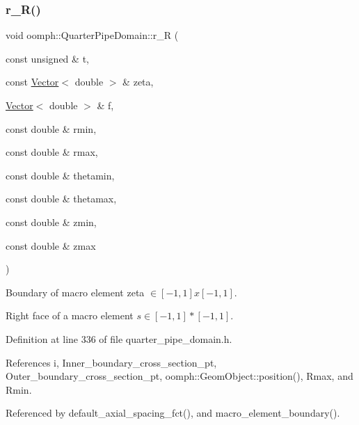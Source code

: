 \subsubsection{\texorpdfstring{r\+\_\+\+R()}{r\_R()}}
{\footnotesize\ttfamily void oomph\+::\+Quarter\+Pipe\+Domain\+::r\+\_\+R (\begin{DoxyParamCaption}\item[{const unsigned \&}]{t,  }\item[{const \hyperlink{classoomph_1_1Vector}{Vector}$<$ double $>$ \&}]{zeta,  }\item[{\hyperlink{classoomph_1_1Vector}{Vector}$<$ double $>$ \&}]{f,  }\item[{const double \&}]{rmin,  }\item[{const double \&}]{rmax,  }\item[{const double \&}]{thetamin,  }\item[{const double \&}]{thetamax,  }\item[{const double \&}]{zmin,  }\item[{const double \&}]{zmax }\end{DoxyParamCaption})\hspace{0.3cm}{\ttfamily [private]}}



Boundary of macro element zeta $ \in [-1,1]x[-1,1] $. 

Right face of a macro element $ s \in [-1,1]*[-1,1] $. 

Definition at line 336 of file quarter\+\_\+pipe\+\_\+domain.\+h.



References i, Inner\+\_\+boundary\+\_\+cross\+\_\+section\+\_\+pt, Outer\+\_\+boundary\+\_\+cross\+\_\+section\+\_\+pt, oomph\+::\+Geom\+Object\+::position(), Rmax, and Rmin.



Referenced by default\+\_\+axial\+\_\+spacing\+\_\+fct(), and macro\+\_\+element\+\_\+boundary().

\mbox{\label{classoomph_1_1QuarterPipeDomain_a5c023c7a9d6e43d123566bc2f7bb21f0}} 
